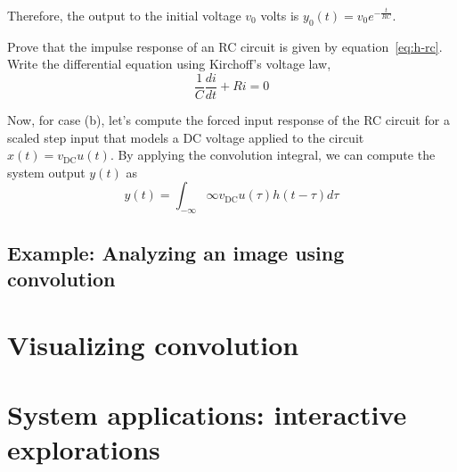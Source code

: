 \documentclass{ee102_notes}
\begin{document}
Therefore, the output to the initial voltage $v_0$ volts is $y_0(t) = v_0 e^{-\frac{t}{RC}}$.

\begin{popquiz}
    Prove that the impulse response of an RC circuit is given by equation~\eqref{eq:h-rc}.
    \popqsplit
    Write the differential equation using Kirchoff's voltage law,
    \[
    \frac{1}{C}\frac{di}{dt} + R i = 0
    \] 
\end{popquiz}

Now, for case (b), let's compute the forced input response of the RC circuit for a scaled step input that models a DC voltage applied to the circuit $x(t) = v_{\text{DC}} u(t)$. By applying the convolution integral, we can compute the system output $y(t)$ as 
\[
y(t) = \int_{-\infty}{\infty} v_{\text{DC}} u(\tau) h(t - \tau) d\tau

\]
\subsection{Example: Analyzing an image using convolution}

\section{Visualizing convolution}

\section{System applications: interactive explorations}
\end{document}
